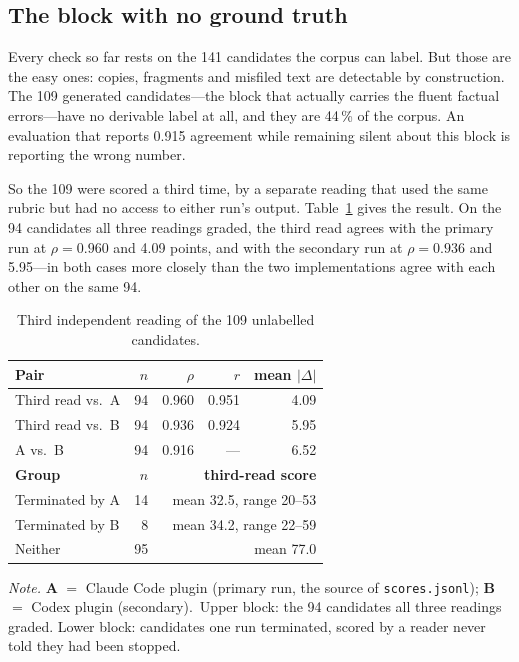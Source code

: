 \documentclass[conference]{IEEEtran}
\newcommand{\tabnote}[1]{%
  \par\vspace{2.5pt}%
  \noindent\parbox{\columnwidth}{\raggedright\scriptsize #1\par}}
\newcommand{\abkey}{\textbf{A} $=$ Claude Code plugin (primary run, the
source of \texttt{scores.jsonl}); \textbf{B} $=$ Codex plugin (secondary).}
\begin{document}
\subsection{The block with no ground truth}
Every check so far rests on the 141 candidates the corpus can label. But
those are the easy ones: copies, fragments and misfiled text are
detectable by construction. The 109 generated candidates---the block
that actually carries the fluent factual errors---have no derivable
label at all, and they are 44\,\% of the corpus. An evaluation that
reports 0.915 agreement while remaining silent about this block is
reporting the wrong number.

So the 109 were scored a third time, by a separate reading that used the
same rubric but had no access to either run's output.
Table~\ref{tab:third} gives the result. On the 94 candidates all three
readings graded, the third read agrees with the primary run at
$\rho = 0.960$ and 4.09 points, and with the secondary run at
$\rho = 0.936$ and 5.95---in both cases more closely than the two
implementations agree with each other on the same 94.

\begin{table}[t]
\caption{Third independent reading of the 109 unlabelled candidates.}
\label{tab:third}
\centering\footnotesize
\begin{tabular}{@{}lrrrr@{}}
\toprule
\textbf{Pair} & \textbf{$n$} & \textbf{$\rho$} & \textbf{$r$} & \textbf{mean $|\Delta|$} \\
\midrule
Third read vs.\ A & 94 & 0.960 & 0.951 & 4.09 \\
Third read vs.\ B & 94 & 0.936 & 0.924 & 5.95 \\
A vs.\ B          & 94 & 0.916 & ---   & 6.52 \\
\midrule
\textbf{Group} & \textbf{$n$} & \multicolumn{3}{r}{\textbf{third-read score}} \\
\midrule
Terminated by A   & 14 & \multicolumn{3}{r}{mean 32.5, range 20--53} \\
Terminated by B   &  8 & \multicolumn{3}{r}{mean 34.2, range 22--59} \\
Neither           & 95 & \multicolumn{3}{r}{mean 77.0} \\
\bottomrule
\end{tabular}
\tabnote{\textit{Note.} \abkey\ Upper block: the 94 candidates all three
readings graded. Lower block: candidates one run terminated, scored by a
reader never told they had been stopped.}
\end{table}
\end{document}
